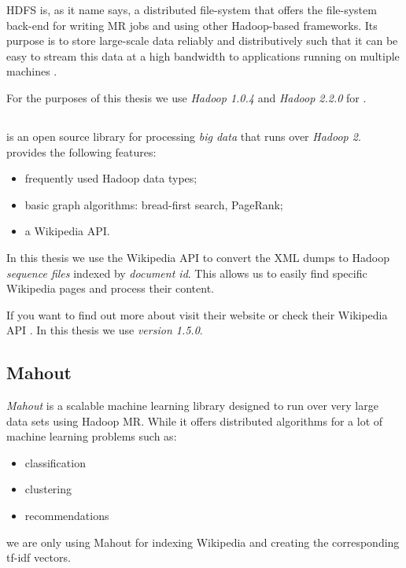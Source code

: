 \acf{HDFS} is, as it name says, a distributed file-system that offers the
file-system back-end for writing \acl{MR} jobs and using other Hadoop-based
frameworks. Its purpose is to store large-scale data reliably and
distributively such that it can be easy to stream this data at a high bandwidth
to applications running on multiple machines \cite{shvachko2010hadoop}.

For the purposes of this thesis we use \emph{Hadoop 1.0.4} and \emph{Hadoop
2.2.0} for \cloud.

\subsection{\cloud}

\emph{\cloud} is an open source library for processing \emph{big data} that
runs over \emph{Hadoop 2}. \cloud provides the following features:
\begin{itemize}
  \item frequently used Hadoop data types;
  \item basic graph algorithms: bread-first search, PageRank;
  \item a Wikipedia \ac{API}.
\end{itemize}
In this thesis we use the Wikipedia \ac{API} to convert the \ac{XML} dumps to
Hadoop \emph{sequence files} indexed by \emph{document id}. This allows us to
easily find specific Wikipedia pages and process their content.

If you want to find out more about \cloud visit their website  or check their Wikipedia \ac{API} . In this thesis we use \emph{\cloud version 1.5.0}.

\subsection{Mahout}

\emph{Mahout} is a scalable machine learning library designed to run over very
large data sets using Hadoop \acl{MR}. While it offers distributed algorithms
for a lot of machine learning problems such as:
\begin{itemize}
  \item classification
  \item clustering
  \item recommendations
\end{itemize}
we are only using Mahout for indexing Wikipedia and creating the corresponding
tf-idf vectors.

